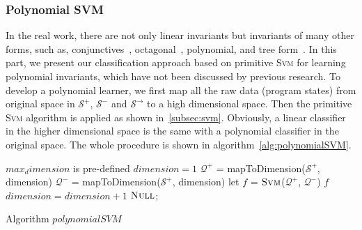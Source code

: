 \subsubsection{Polynomial SVM}
In the real work, there are not only linear invariants but invariants of many other forms, 
such as, conjunctives~\cite{sharma2012interpolants}, octagonal~\cite{mine2006octagon}, polynomial, and tree form~\cite{krishna2015learning}\cite{garg2015learning}.
In this part, we present our classification approach based on primitive \textsc{Svm} for learning polynomial invariants,
which have not been discussed by previous research.
To develop a polynomial learner, 
we first map all the raw data (program states) from original space in $\mathcal{S}^+$, $\mathcal{S}^-$ and $\mathcal{S}^\rightarrow$ 
to a high dimensional space.
Then the primitive \textsc{Svm} algorithm is applied as shown in~\ref{subsec:svm}.
Obviously, a linear classifier in the higher dimensional space is the same with a polynomial classifier in the original space.
The whole procedure is shown in algorithm~\ref{alg:polynomialSVM}.

\begin{algorithm}[!h]
\SetAlgoVlined
\Indm
{}
\Indp
    $max_dimension$ is pre-defined\;
    $dimension = 1$\;
     {
        $\mathcal{Q}^+$ = mapToDimension($\mathcal{S}^+$, dimension)\;
        $\mathcal{Q}^-$ = mapToDimension($\mathcal{S}^+$, dimension)\;
        let $f$ = $\textsc{Svm}$($\mathcal{Q}^+$, $\mathcal{Q}^-$)\;
         {
        	\Return $f$\;
    	}
    	$dimension = dimension + 1$\;
    }
    \Return $\textsc{Null}$;
\caption{Algorithm $polynomialSVM$}
\label{alg:polynomialSVM}
\end{algorithm}

